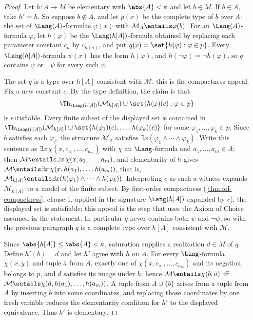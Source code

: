 \begin{proof}
Let \(h:A\to M\) be elementary with \(\abs{A}<\kappa\) and let \(b\in M\).
If \(b\in A\), take \(h'=h\).  So suppose \(b\notin A\), and let \(p(x)\)
be the complete type of \(b\) over \(A\): the set of
\(\Lang(A)\)-formulas \(\varphi(x)\) with
\(\mathcal M_A\entails\varphi(b)\).  For an \(\Lang(A)\)-formula
\(\varphi\), let \(h(\varphi)\) be the \(\Lang(h[A])\)-formula obtained by
replacing each parameter constant \(c_a\) by \(c_{h(a)}\), and put
\(q(x)=\set{h(\varphi):\varphi\in p}\).  Every \(\Lang(h[A])\)-formula
\(\psi(x)\) has the form \(h(\varphi)\), and
\(h(\neg\varphi)=\neg h(\varphi)\), so \(q\) contains \(\psi\) or
\(\neg\psi\) for every such \(\psi\).

The set \(q\) is a type over \(h[A]\) consistent with \(\mathcal M\); this
is the compactness appeal.  Fix a new constant \(c\).  By the type
definition, the claim is that
\[
  \Th_{\Lang(h[A])}(\mathcal M_{h[A]})\cup\set{h(\varphi)(c):\varphi\in p}
\]
is satisfiable.  Every finite subset of the displayed set is contained in
\(\Th_{\Lang(h[A])}(\mathcal M_{h[A]})\cup
\set{h(\varphi_1)(c),\ldots,h(\varphi_k)(c)}\) for some
\(\varphi_1,\ldots,\varphi_k\in p\).  Since \(b\) satisfies each
\(\varphi_i\), the structure \(\mathcal M_A\) satisfies
\(\exists x(\varphi_1\land\cdots\land\varphi_k)\).  Write this sentence as
\(\exists x\,\chi(x,c_{a_1},\ldots,c_{a_m})\) with \(\chi\) an
\(\Lang\)-formula and \(a_1,\ldots,a_m\in A\); then
\(\mathcal M\entails\exists x\,\chi(x,a_1,\ldots,a_m)\), and elementarity
of \(h\) gives
\(\mathcal M\entails\exists x\,\chi(x,h(a_1),\ldots,h(a_m))\), that is,
\(\mathcal M_{h[A]}\entails
\exists x(h(\varphi_1)\land\cdots\land h(\varphi_k))\).  Interpreting
\(c\) as such a witness expands \(\mathcal M_{h[A]}\) to a model of the
finite subset.  By first-order compactness (\cref{thm:fol-compactness},
clause 1, applied in the signature \(\Lang(h[A])\) expanded by \(c\)), the
displayed set is satisfiable; this appeal is the step that uses the Axiom
of Choice assumed in the statement.  In particular \(q\) never contains
both \(\psi\) and \(\neg\psi\), so with the previous paragraph \(q\) is a
complete type over \(h[A]\) consistent with \(\mathcal M\).

Since \(\abs{h[A]}\leq\abs{A}<\kappa\), saturation supplies a realization
\(d\in M\) of \(q\).  Define \(h'(b)=d\) and let \(h'\) agree with \(h\) on
\(A\).  For every \(\Lang\)-formula \(\chi(x,\bar y)\) and tuple \(\bar a\)
from \(A\), exactly one of \(\chi(x,c_{a_1},\ldots,c_{a_m})\) and its
negation belongs to \(p\), and \(d\) satisfies its image under \(h\);
hence \(\mathcal M\entails\chi(b,\bar a)\) iff
\(\mathcal M\entails\chi(d,h(a_1),\ldots,h(a_m))\).  A tuple from
\(A\cup\{b\}\) arises from a tuple from \(A\) by inserting \(b\) into some
coordinates, and replacing those coordinates by one fresh variable reduces
the elementarity condition for \(h'\) to the displayed equivalence.  Thus
\(h'\) is elementary.
\end{proof}

